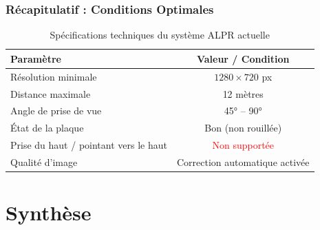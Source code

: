 \documentclass[
	11pt,
	aspectratio=169,
]{beamer}
\begin{document}

\begin{frame}
	\frametitle{Récapitulatif : Conditions Optimales}
	
	\begin{table}
		\centering
		\begin{tabular}{lc}
			\toprule
			\textbf{Paramètre} & \textbf{Valeur / Condition} \\
			\midrule
			Résolution minimale & $1280 \times 720$ px \\
			Distance maximale & 12 mètres \\
			Angle de prise de vue & 45° -- 90° \\
			État de la plaque & Bon (non rouillée) \\
			Prise du haut / pointant vers le haut & \textcolor{red}{Non supportée} \\
			Qualité d'image & Correction automatique activée \\
			\bottomrule
		\end{tabular}
		\caption{Spécifications techniques du système ALPR actuelle}
	\end{table}
\end{frame}


\section{Synthèse}
\end{document}
